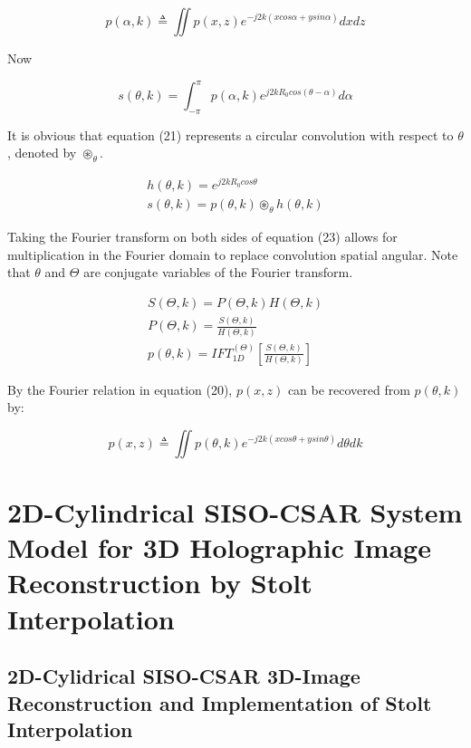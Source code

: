 \documentclass{IEEEtran}
\begin{document}
\begin{equation}
	p(\alpha,k) \triangleq \iint p(x,z) e^{-j2k(xcos\alpha+ysin\alpha)}dxdz
\end{equation}

Now

\begin{equation}
	s(\theta,k) = \int_{-\pi}^{\pi} p(\alpha,k) e^{j2kR_0cos(\theta-\alpha)}d\alpha
\end{equation}

It is obvious that equation (21) represents a circular convolution with respect to $\theta$, denoted by $\circledast_{\theta}$.

\begin{gather}
	h(\theta,k) = e^{j2kR_0cos\theta}\\
	s(\theta,k) = p(\theta,k) \circledast_{\theta} h(\theta,k)
\end{gather}

Taking the Fourier transform on both sides of equation (23) allows for multiplication in the Fourier domain to replace convolution spatial angular. Note that $\theta$ and $\Theta$ are conjugate variables of the Fourier transform.

\begin{gather}
	S(\Theta,k) = P(\Theta,k)H(\Theta,k) \\
	P(\Theta,k) = \frac{S(\Theta,k)}{H(\Theta,k)} \\
	p(\theta,k) = IFT_{1D}^{(\Theta)}\left[ \frac{S(\Theta,k)}{H(\Theta,k)} \right]
\end{gather}

By the Fourier relation in equation (20), $p(x,z)$ can be recovered from $p(\theta,k)$ by:

\begin{equation}
	p(x,z) \triangleq \iint p(\theta,k) e^{-j2k(xcos\theta+ysin\theta)}d\theta dk
\end{equation}

\section{2D-Cylindrical SISO-CSAR System Model for 3D Holographic Image Reconstruction by Stolt Interpolation}


\subsection{2D-Cylidrical SISO-CSAR 3D-Image Reconstruction and Implementation of Stolt Interpolation}
\end{document}
